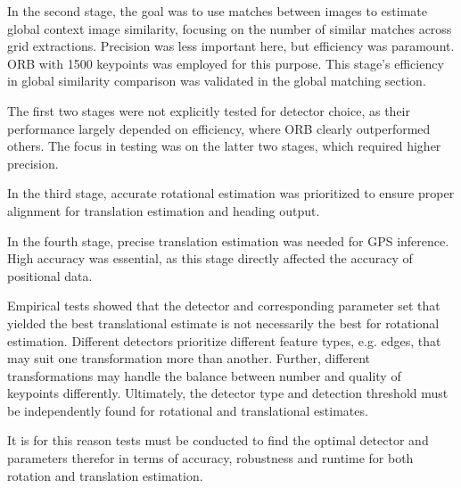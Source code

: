 In the second stage, the goal was to use matches between images to estimate global context image similarity, focusing on the number of similar matches across grid extractions. Precision was less important here, but efficiency was paramount. ORB with 1500 keypoints was employed for this purpose. This stage’s efficiency in global similarity comparison was validated in the global matching section.

The first two stages were not explicitly tested for detector choice, as their performance largely depended on efficiency, where ORB clearly outperformed others. The focus in testing was on the latter two stages, which required higher precision.

In the third stage, accurate rotational estimation was prioritized to ensure proper alignment for translation estimation and heading output. 

In the fourth stage, precise translation estimation was needed for GPS inference. High accuracy was essential, as this stage directly affected the accuracy of positional data.

Empirical tests showed that the detector and corresponding parameter set that yielded the best translational estimate is not necessarily the best for rotational estimation. Different detectors prioritize different feature types, e.g. edges, that may suit one transformation more than another. Further, different transformations may handle the balance between number and quality of keypoints differently. Ultimately, the detector type and detection threshold must be independently found for rotational and translational estimates. 

It is for this reason tests must be conducted to find the optimal detector and parameters therefor in terms of accuracy, robustness and runtime for both rotation and translation estimation.



